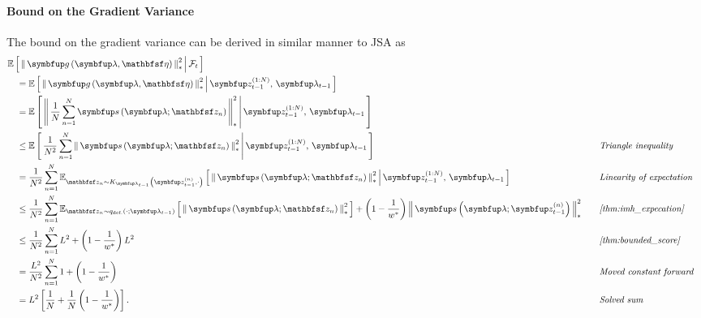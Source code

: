 \begin{proofEnd}
  \paragraph{\textbf{Bound on the Gradient Variance}}
  The bound on the gradient variance can be derived in similar manner to JSA as
  \begin{alignat}{2}
    &\E{ \norm{ \vg\left(\vlambda, \rvveta\right) }^2_{*} \,\middle|\, \mathcal{F}_{t} }
    \nonumber
    \\
    &\quad=
    \E{ \norm{ \vg\left(\vlambda, \rvveta\right) }^2_{*} \,\middle|\, \vz_{t-1}^{(1:N)},\, \vlambda_{t-1} }
    \nonumber
    \\
    &\quad=
    \E{ \norm{ \frac{1}{N}\sum^{N}_{n=1} \vs\left(\vlambda; \rvvz_{n}\right) }^2_{*} \,\middle|\, \vz_{t-1}^{(1:N)},\, \vlambda_{t-1} }
    \nonumber
    \\
    &\quad\leq
    \E{  \frac{1}{N^2} \sum^{N}_{n=1} \norm{\vs\left(\vlambda; \rvvz_{n}\right) }^2_{*} \,\middle|\, \vz_{t-1}^{(1:N)},\, \vlambda_{t-1} }
    &&\quad\text{\textit{Triangle inequality}}
    \nonumber
    \\
    &\quad=
    \frac{1}{N^2}\sum^{N}_{n=1} \Esub{\rvvz_{n} \sim K_{\vlambda_{t-1}}\left(\vz_{t-1}^{(n)}, \cdot\right)}{ \norm{\vs\left(\vlambda; \rvvz_{n}\right) }^2_{*} \,\middle|\,  \vz_{t-1}^{(1:N)},\, \vlambda_{t-1} }
    &&\quad\text{\textit{Linearity of expectation}}
    \nonumber
    \\
    &\quad\leq
    \frac{1}{N^2}\sum^{N}_{n=1}
      \Esub{\rvvz_n \sim q_{\text{def.}}\left(\cdot;\vlambda_{t-1}\right)}{ \norm{\vs\left(\vlambda; \rvvz_n \right)}_{*}^2 }
      +
      {\left(1 - \frac{1}{w^*}\right)} \, \norm{\vs\left(\vlambda; \vz_{t-1}^{(n)} \right)}_{*}^2
    &&\quad\text{\textit{\cref{thm:imh_expecation}}}
    \nonumber
    \\
    &\quad\leq
    \frac{1}{N^2}\sum^{N}_{n=1}
        L^2 + {\left(1 - \frac{1}{w^*}\right)} \, L^2
    &&\quad\text{\textit{\cref{thm:bounded_score}}}
    \nonumber
    \\
    &\quad=
    \frac{L^2}{N^2} \sum^{N}_{n=1}
      1 + {\left(1 - \frac{1}{w^*}\right)}
    \nonumber
    &&\quad\text{\textit{Moved constant forward}}
    \\
    &\quad=
    L^2 \left[ \frac{1}{N} + \frac{1}{N}\,{\left(1 - \frac{1}{w^*}\right)} \right].
    \nonumber
    &&\quad\text{\textit{Solved sum}}
  \end{alignat}
\end{proofEnd}

